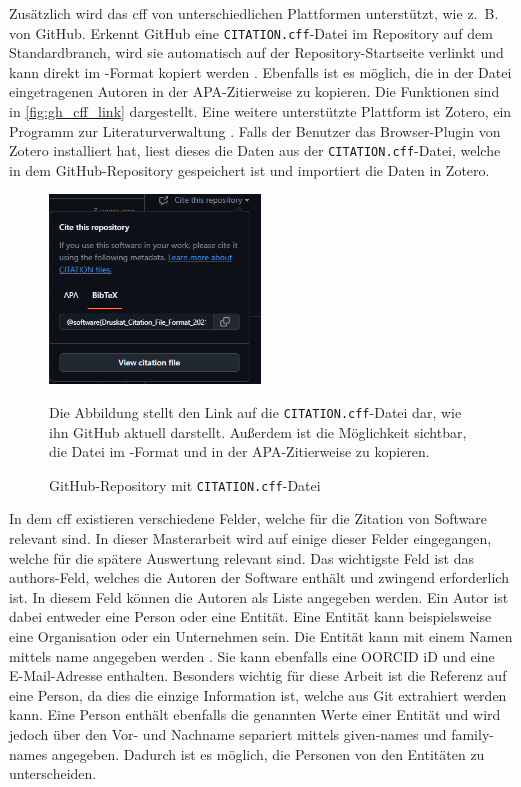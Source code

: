 Zusätzlich wird das \gls{cff} von unterschiedlichen Plattformen unterstützt, wie z. B. von GitHub.
Erkennt GitHub eine \texttt{CITATION.cff}-Datei im Repository auf dem Standardbranch, wird sie automatisch auf der Repository-Startseite verlinkt und kann direkt im -Format kopiert werden \autocites{druskat_citation_2021}{github_about_2024-1}.
Ebenfalls ist es möglich, die in der Datei eingetragenen Autoren in der APA-Zitierweise zu kopieren.
Die Funktionen sind in \autoref{fig:gh_cff_link} dargestellt.
Eine weitere unterstützte Plattform ist Zotero, ein Programm zur Literaturverwaltung \autocites{druskat_citation_2021}{zotero_zotero_2024}.
Falls der Benutzer das Browser-Plugin von Zotero installiert hat, liest dieses die Daten aus der \texttt{CITATION.cff}-Datei, welche in dem GitHub-Repository gespeichert ist und importiert die Daten in Zotero.

\begin{figure}
    \begin{center}
      \includegraphics[width=0.5\textwidth]{bilder/GH_CFF_link.png}
    \end{center}
    \caption{GitHub-Repository mit \texttt{CITATION.cff}-Datei}
    \label{fig:gh_cff_link}
    \small
    Die Abbildung stellt den Link auf die \texttt{CITATION.cff}-Datei dar, wie ihn GitHub aktuell darstellt.
    Außerdem ist die Möglichkeit sichtbar, die Datei im -Format und in der APA-Zitierweise zu kopieren.
\end{figure}

In dem \gls{cff} existieren verschiedene Felder, welche für die Zitation von Software relevant sind.
In dieser Masterarbeit wird auf einige dieser Felder eingegangen, welche für die spätere Auswertung relevant sind.
Das wichtigste Feld ist das \glqq authors\grqq{}-Feld, welches die Autoren der Software enthält und zwingend erforderlich ist.
In diesem Feld können die Autoren als Liste angegeben werden.
Ein Autor ist dabei entweder eine Person oder eine Entität.
Eine Entität kann beispielsweise eine Organisation oder ein Unternehmen sein.
Die Entität kann mit einem Namen mittels \glqq name\grqq{} angegeben werden \autocite{druskat_citation_2021}.
Sie kann ebenfalls eine OORCID iD und eine E-Mail-Adresse enthalten.
Besonders wichtig für diese Arbeit ist die Referenz auf eine Person, da dies die einzige Information ist, welche aus Git extrahiert werden kann.
Eine Person enthält ebenfalls die genannten Werte einer Entität und wird jedoch über den Vor- und Nachname separiert mittels \glqq given-names\grqq{} und \glqq family-names\grqq{} angegeben.
Dadurch ist es möglich, die Personen von den Entitäten zu unterscheiden.

